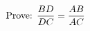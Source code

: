 \documentclass[preview]{standalone}
\begin{document}
\begin{align*}
\special{dvisvgm:raw <g id='unique000'>}\text{Prove: }\frac{BD}{DC}=\frac{AB}{AC}\special{dvisvgm:raw </g>}
\end{align*}
\end{document}
